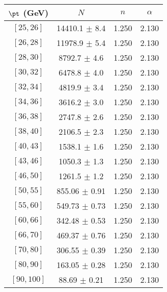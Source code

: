\begin{tabular}{c||c|c|c}
$\pt$ (GeV) & $N$ & $n$ & $\alpha$ \\
\hline
$[25, 26]$ & 14410.1 $\pm$ 8.4 & 1.250 & 2.130\\
$[26, 28]$ & 11978.9 $\pm$ 5.4 & 1.250 & 2.130\\
$[28, 30]$ & 8792.7 $\pm$ 4.6 & 1.250 & 2.130\\
$[30, 32]$ & 6478.8 $\pm$ 4.0 & 1.250 & 2.130\\
$[32, 34]$ & 4819.9 $\pm$ 3.4 & 1.250 & 2.130\\
$[34, 36]$ & 3616.2 $\pm$ 3.0 & 1.250 & 2.130\\
$[36, 38]$ & 2747.8 $\pm$ 2.6 & 1.250 & 2.130\\
$[38, 40]$ & 2106.5 $\pm$ 2.3 & 1.250 & 2.130\\
$[40, 43]$ & 1538.1 $\pm$ 1.6 & 1.250 & 2.130\\
$[43, 46]$ & 1050.3 $\pm$ 1.3 & 1.250 & 2.130\\
$[46, 50]$ & 1261.5 $\pm$ 1.2 & 1.250 & 2.130\\
$[50, 55]$ & 855.06 $\pm$ 0.91 & 1.250 & 2.130\\
$[55, 60]$ & 549.73 $\pm$ 0.73 & 1.250 & 2.130\\
$[60, 66]$ & 342.48 $\pm$ 0.53 & 1.250 & 2.130\\
$[66, 70]$ & 469.37 $\pm$ 0.76 & 1.250 & 2.130\\
$[70, 80]$ & 306.55 $\pm$ 0.39 & 1.250 & 2.130\\
$[80, 90]$ & 163.05 $\pm$ 0.28 & 1.250 & 2.130\\
$[90, 100]$ & 88.69 $\pm$ 0.21 & 1.250 & 2.130\\
\end{tabular}
